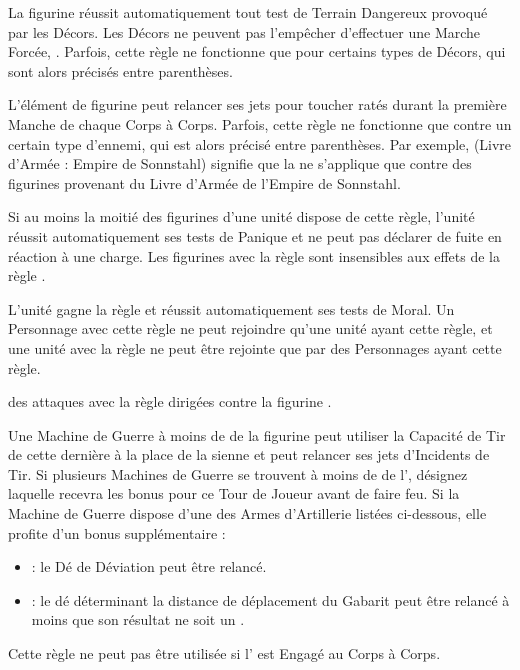 
La figurine réussit automatiquement tout test de Terrain Dangereux provoqué par les Décors. Les Décors ne peuvent pas l'empêcher d'effectuer une Marche Forcée, . Parfois, cette règle ne fonctionne que pour certains types de Décors, qui sont alors précisés entre parenthèses.


L'élément de figurine peut relancer ses jets pour toucher ratés durant la première Manche de chaque Corps à Corps. Parfois, cette règle ne fonctionne que contre un certain type d'ennemi, qui est alors précisé entre parenthèses. Par exemple, \og \hatred{} (Livre d'Armée : Empire de Sonnstahl) \fg{} signifie que la \hatred{} ne s'applique que contre des figurines provenant du Livre d'Armée de l'Empire de Sonnstahl.


Si au moins la moitié des figurines d'une unité dispose de cette règle, l'unité réussit automatiquement ses tests de Panique et ne peut pas déclarer de fuite en réaction à une charge. Les figurines avec la règle \immunetopsychology{} sont insensibles aux effets de la règle \fear{}.


L'unité gagne la règle \immunetopsychology{} et réussit automatiquement ses tests de Moral. Un Personnage avec cette règle ne peut rejoindre qu'une unité ayant cette règle, et une unité avec la règle \unbreakable{} ne peut être rejointe que par des Personnages ayant cette règle.


 des attaques avec la règle \flamingattacks{} dirigées contre la figurine .


Une Machine de Guerre à moins de  de la figurine peut utiliser la Capacité de Tir de cette dernière à la place de la sienne et peut relancer ses jets d'Incidents de Tir. Si plusieurs Machines de Guerre se trouvent à moins de  de l'\engineer{}, désignez laquelle recevra les bonus pour ce Tour de Joueur avant de faire feu. Si la Machine de Guerre dispose d'une des Armes d'Artillerie listées ci-dessous, elle profite d'un bonus supplémentaire :
\begin{itemize}[label={\textbullet}]
\item \catapult{} : le Dé de Déviation peut être relancé.
\item \flamethrower{} : le dé déterminant la distance de déplacement du Gabarit peut être relancé à moins que son résultat ne soit un .
\end{itemize}
Cette règle ne peut pas être utilisée si l'\engineer{} est Engagé au Corps à Corps.

